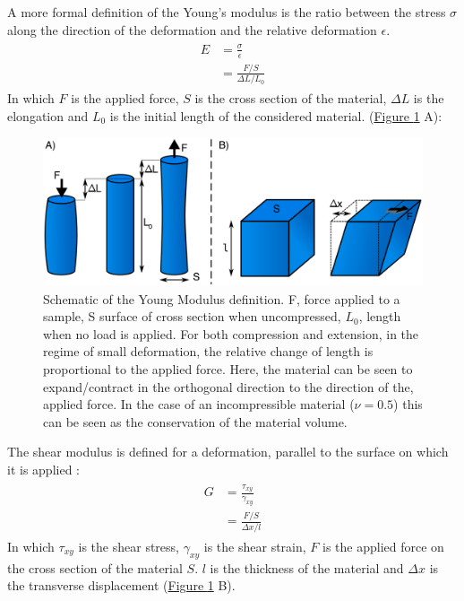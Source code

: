 \documentclass[A4paperpaper,11pt,english]{sphinxmanual}
\begin{document}
A  more formal definition of the Young's modulus is the ratio between
the stress \(\sigma\) along the direction of the deformation and the relative deformation \(\epsilon\).
\label{parts/part1:equation-eqa8}\begin{gather}
\begin{split}E &= \frac{\sigma}{\epsilon} \\
  & = \frac{   F/S }{   \Delta L / L_0        }\end{split}\label{parts/part1-eqa8}
\end{gather}
In which \(F\) is the applied force, \(S\) is the cross section of the
material, \(\Delta L\) is the elongation and \(L_0\) is the initial
length of the considered material.  (\hyperref[parts/part1:fym]{Figure  \ref*{parts/part1:fym}} A):
\begin{figure}[htbp]
\centering
\capstart

\includegraphics[width=0.800\linewidth]{youngm.png}
\caption{Schematic of the Young Modulus definition. F, force applied to a sample, S
surface of cross section when uncompressed, \(L_0\), length when no load
is applied. For both compression and extension, in the regime of small
deformation, the relative change of length is proportional to the applied
force. Here, the material can be seen to expand/contract in the orthogonal direction
to the direction of the, applied force. In the case of an
incompressible material (\(\nu = 0.5\)) this can be seen as the
conservation of the material volume.}\label{parts/part1:fym}\end{figure}

The shear modulus is defined for a deformation, parallel to the surface on which it is applied :
\label{parts/part1:equation-eqa9}\begin{gather}
\begin{split}G &= \frac{\tau_{xy}}{\gamma_{xy}} \\
  & = \frac{   F/S }{   \Delta x / l        }\end{split}\label{parts/part1-eqa9}
\end{gather}
In which \(\tau_{xy}\) is the shear stress, \(\gamma_{xy}\) is the shear strain, \(F\) is the applied force
on the cross section of the material \(S\). \(l\) is the thickness of the material and \(\Delta x\) is the
transverse displacement (\hyperref[parts/part1:fym]{Figure  \ref*{parts/part1:fym}} B).
\end{document}
